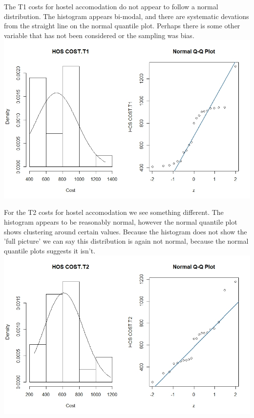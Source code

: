 \documentclass[]{article}
\begin{document}
The T1 costs for hostel accomodation do not appear to follow a normal distribution. The histogram appears bi-modal, and there are systematic devations from the straight line on the normal quantile plot. Perhaps there is some other variable that has not been considered or the sampling was bias.
\centering
\includegraphics[width=\textwidth]{RStudio/jpeg/Norm_HOS_T1.jpeg}
\raggedright

For the T2 costs for hostel accomodation we see something different. The histogram appears to be reasonably normal, however the normal quantile plot shows clustering around certain values. Because the histogram does not show the 'full picture' we can say this distribution is again not normal, because the normal quantile plots suggests it isn't.
\centering
\includegraphics[width=\textwidth]{RStudio/jpeg/Norm_HOS_T2.jpeg}
\raggedright
\end{document}

